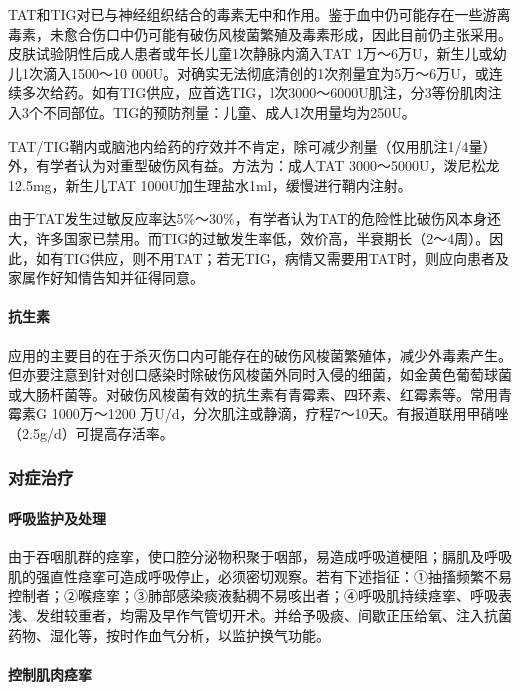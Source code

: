 TAT和TIG对已与神经组织结合的毒素无中和作用。鉴于血中仍可能存在一些游离毒素，未愈合伤口中仍可能有破伤风梭菌繁殖及毒素形成，因此目前仍主张采用。皮肤试验阴性后成人患者或年长儿童1次静脉内滴入TAT
1万～6万U，新生儿或幼儿1次滴入1500～10
000U。对确实无法彻底清创的1次剂量宜为5万～6万U，或连续多次给药。如有TIG供应，应首选TIG，l次3000～6000U肌注，分3等份肌肉注入3个不同部位。TIG的预防剂量：儿童、成人1次用量均为250U。

TAT/TIG鞘内或脑池内给药的疗效并不肯定，除可减少剂量（仅用肌注1/4量）外，有学者认为对重型破伤风有益。方法为：成人TAT
3000～5000U，泼尼松龙12.5mg，新生儿TAT
1000U加生理盐水1ml，缓慢进行鞘内注射。

由于TAT发生过敏反应率达5\%～30\%，有学者认为TAT的危险性比破伤风本身还大，许多国家已禁用。而TIG的过敏发生率低，效价高，半衰期长（2～4周）。因此，如有TIG供应，则不用TAT；若无TIG，病情又需要用TAT时，则应向患者及家属作好知情告知并征得同意。

\paragraph{抗生素}

应用的主要目的在于杀灭伤口内可能存在的破伤风梭菌繁殖体，减少外毒素产生。但亦要注意到针对创口感染时除破伤风梭菌外同时入侵的细菌，如金黄色葡萄球菌或大肠杆菌等。对破伤风梭菌有效的抗生素有青霉素、四环素、红霉素等。常用青霉素G
1000万～1200
万U/d，分次肌注或静滴，疗程7～10天。有报道联用甲硝唑（2.5g/d）可提高存活率。

\subsubsection{对症治疗}

\paragraph{呼吸监护及处理}

由于吞咽肌群的痉挛，使口腔分泌物积聚于咽部，易造成呼吸道梗阻；膈肌及呼吸肌的强直性痉挛可造成呼吸停止，必须密切观察。若有下述指征：①抽搐频繁不易控制者；②喉痉挛；③肺部感染痰液黏稠不易咳出者；④呼吸肌持续痉挛、呼吸表浅、发绀较重者，均需及早作气管切开术。并给予吸痰、间歇正压给氧、注入抗菌药物、湿化等，按时作血气分析，以监护换气功能。

\paragraph{控制肌肉痉挛}

